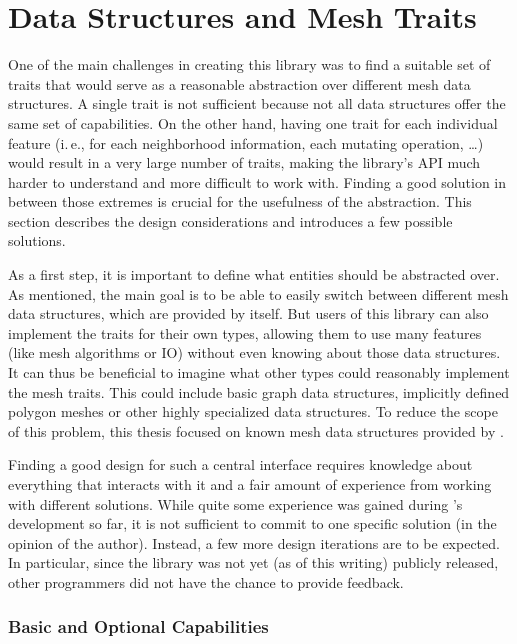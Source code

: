 \section{Data Structures and Mesh Traits}
\label{chap:mesh-traits}

One of the main challenges in creating this library was to find a suitable set of traits that would serve as a reasonable abstraction over different mesh data structures.
A single trait is not sufficient because not all data structures offer the same set of capabilities.
On the other hand, having one trait for each individual feature (i.\,e., for each neighborhood information, each mutating operation, \dots) would result in a very large number of traits, making the library's API much harder to understand and more difficult to work with.
Finding a good solution in between those extremes is crucial for the usefulness of the abstraction.
This section describes the design considerations and introduces a few possible solutions.

As a first step, it is important to define what entities should be abstracted over.
As mentioned, the main goal is to be able to easily switch between different mesh data structures, which are provided by  itself.
But users of this library can also implement the traits for their own types, allowing them to use many features (like mesh algorithms or IO) without  even knowing about those data structures.
It can thus be beneficial to imagine what other types could reasonably implement the mesh traits.
This could include basic graph data structures, implicitly defined polygon meshes or other highly specialized data structures.
To reduce the scope of this problem, this thesis focused on known mesh data structures provided by .

Finding a good design for such a central interface requires knowledge about everything that interacts with it and a fair amount of experience from working with different solutions.
While quite some experience was gained during 's development so far, it is not sufficient to commit to one specific solution (in the opinion of the author).
Instead, a few more design iterations are to be expected.
In particular, since the library was not yet (as of this writing) publicly released, other programmers did not have the chance to provide feedback.


\subsubsection*{Basic and Optional Capabilities}

